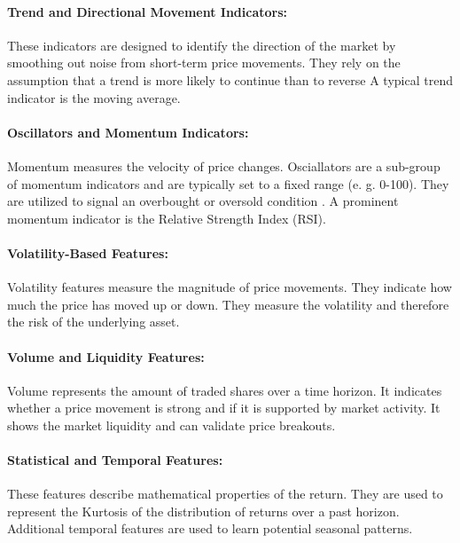 \documentclass[12pt,twoside=false,a4paper,parskip]{scrbook}
\begin{document}
\paragraph{Trend and Directional Movement Indicators:}
These indicators are designed to identify the direction of the market by smoothing out noise from short-term price movements. They rely on the assumption that a trend is more likely to continue than to reverse \cite{pring2002technical}
A typical trend indicator is the moving average.


\paragraph{Oscillators and Momentum Indicators:}
Momentum measures the velocity of price changes. Osciallators are a sub-group of momentum indicators and are typically set to a fixed range (e. g. 0-100). They are utilized to signal an overbought or oversold condition \cite{wilder1978new}.
A prominent momentum indicator is the Relative Strength Index (RSI).

\paragraph{Volatility-Based Features:}
Volatility features measure the magnitude of price movements. They indicate how much the price has moved up or down. They measure the volatility and therefore the risk of the underlying asset.

\paragraph{Volume and Liquidity Features:}
Volume represents the amount of traded shares over a time horizon. It indicates whether a price movement is strong and if it is supported by market activity. It shows the market liquidity and can validate price breakouts. 

\paragraph{Statistical and Temporal Features:}
These features describe mathematical properties of the return. They are used to represent the Kurtosis of the distribution of returns over a past horizon.
Additional temporal features are used to learn potential seasonal patterns.
\end{document}
